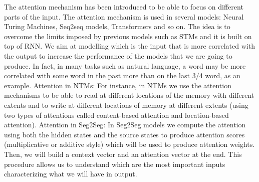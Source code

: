\begin{box-stud}
    The attention mechanism has been introduced to be able to focus on different parts of the input. The attention mechanism is used in several models: Neural Turing Machines, Seq2seq models, Transformers and so on. The idea is to overcome the limits imposed by previous models such as STMs and it is built on top of RNN. We aim at modelling which is the input that is more correlated with the output to increase the performance of the models that we are going to produce. In fact, in many tasks such as natural language, a word may be more correlated with some word in the past more than on the last 3/4 word, as an example. Attention in NTMs: For instance, in NTMs we use the attention mechanisms to be able to read at different locations of the memory with different extents and to write at different locations of memory at different extents (using two types of attentions called content-based attention and location-based attention). Attention in Seg2Seg: In Seg2Seg models we compute the attention using both the hidden states and the source states to produce attention scores (multiplicative or additive style) which will be used to produce attention weights. Then, we will build a context vector and an attention vector at the end. This procedure allows us to understand which are the most important inputs characterizing what we will have in output.
\end{box-stud}



















